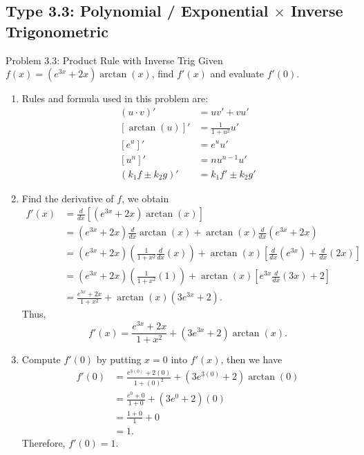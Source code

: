 \documentclass[11pt,a4paper]{article}
\begin{document}
\subsection{Type 3.3: Polynomial / Exponential $\times$ Inverse Trigonometric}
\begin{problembox}{Problem 3.3: Product Rule with Inverse Trig}
Given $f(x) = (e^{3x} + 2x)\arctan(x)$, find $f'(x)$ and evaluate $f'(0)$.
\end{problembox}
\begin{solutionbox}
\begin{enumerate}
	\item [Step 1.] Rules and formula used in this problem are:
	\begin{align*}
		(u \cdot v)' &= u v' + v u' \\
		[\arctan(u)]' &= \frac{1}{1+u^2} u' \\
		[e^u]' &= e^u u' \\
		[u^n]' &= n u^{n-1} u' \\
		(k_1f \pm k_2 g)' &= k_1f' \pm k_2g'
	\end{align*}
	
	\item [Step 2.] Find the derivative of $f$, we obtain
	\begin{align*}
		f'(x) &= \frac{d}{dx} \left[ (e^{3x} + 2x)\arctan(x) \right] \\
		&= (e^{3x} + 2x) \frac{d}{dx} \arctan(x) + \arctan(x) \frac{d}{dx} (e^{3x} + 2x) \\
		&= (e^{3x} + 2x) \left( \frac{1}{1+x^2} \frac{d}{dx}(x) \right) + \arctan(x) \left[ \frac{d}{dx}(e^{3x}) + \frac{d}{dx}(2x) \right] \\
		&= (e^{3x} + 2x) \left( \frac{1}{1+x^2} (1) \right) + \arctan(x) \left[ e^{3x}\frac{d}{dx}(3x) + 2 \right] \\
		&= \frac{e^{3x} + 2x}{1+x^2} + \arctan(x) (3e^{3x} + 2).
	\end{align*}
	Thus,
	\begin{equation*}
		f'(x) = \frac{e^{3x} + 2x}{1+x^2} + (3e^{3x} + 2)\arctan(x).
	\end{equation*}
	
	\item [Step 3.] Compute $f'(0)$ by putting $x = 0$ into $f'(x)$, then we have
	\begin{align*}
		f'(0) &= \frac{e^{3(0)} + 2(0)}{1+(0)^2} + (3e^{3(0)} + 2)\arctan(0) \\
		&= \frac{e^{0} + 0}{1+0} + (3e^{0} + 2)(0) \\
		&= \frac{1 + 0}{1} + 0 \\
		&= 1.
	\end{align*}
	Therefore, $f'(0) = 1$.
\end{enumerate}
\end{solutionbox}
\end{document}
